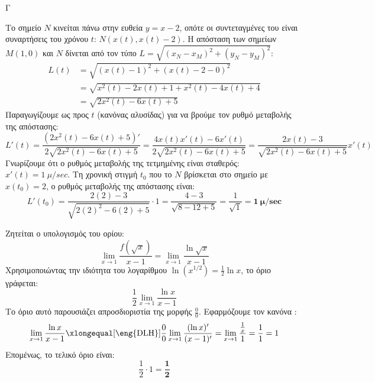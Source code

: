 \begin{thema}{Γ}
\begin{erwthma}
\item Το σημείο $N$ κινείται πάνω στην ευθεία $y = x - 2$, οπότε οι συντεταγμένες του είναι συναρτήσεις του χρόνου $t$: $N(x(t), x(t) - 2)$.
Η απόσταση των σημείων $M(1, 0)$ και $N$ δίνεται από τον τύπο $L = \sqrt{(x_N - x_M)^2 + (y_N - y_M)^2}$:
\begin{align*}
L(t) &= \sqrt{(x(t) - 1)^2 + (x(t) - 2 - 0)^2} \\
&= \sqrt{x^2(t) - 2x(t) + 1 + x^2(t) - 4x(t) + 4} \\
&= \sqrt{2x^2(t) - 6x(t) + 5}
\end{align*}
Παραγωγίζουμε ως προς $t$ (κανόνας αλυσίδας) για να βρούμε τον ρυθμό μεταβολής της απόστασης:
\[ L'(t) = \frac{(2x^2(t) - 6x(t) + 5)'}{2\sqrt{2x^2(t) - 6x(t) + 5}} = \frac{4x(t)x'(t) - 6x'(t)}{2\sqrt{2x^2(t) - 6x(t) + 5}} = \frac{2x(t) - 3}{\sqrt{2x^2(t) - 6x(t) + 5}} x'(t) \]
Γνωρίζουμε ότι ο ρυθμός μεταβολής της τετμημένης είναι σταθερός: $x'(t) = 1 \ \mu/\si{sec}$.
Τη χρονική στιγμή $t_0$ που το $N$ βρίσκεται στο σημείο με $x(t_0) = 2$, ο ρυθμός μεταβολής της απόστασης είναι:
\[ L'(t_0) = \frac{2(2) - 3}{\sqrt{2(2)^2 - 6(2) + 5}} \cdot 1 = \frac{4 - 3}{\sqrt{8 - 12 + 5}} = \frac{1}{\sqrt{1}} = \boldsymbol{1 \ \mu/\si{sec}} \]

\item Ζητείται ο υπολογισμός του ορίου:
\[ \lim_{x \to 1} \frac{f(\sqrt{x})}{x - 1} = \lim_{x \to 1} \frac{\ln\sqrt{x}}{x - 1} \]
Χρησιμοποιώντας την ιδιότητα του λογαρίθμου $\ln(x^{1/2}) = \frac{1}{2}\ln x$, το όριο γράφεται:
\[ \frac{1}{2} \lim_{x \to 1} \frac{\ln x}{x - 1} \]
Το όριο αυτό παρουσιάζει απροσδιοριστία της μορφής $\frac{0}{0}$. Εφαρμόζουμε τον κανόνα :
\[ \lim_{x \to 1} \frac{\ln x}{x - 1} \xlongequal[\text{\eng{DLH}}]{\frac{0}{0}} \lim_{x \to 1} \frac{(\ln x)'}{(x - 1)'} = \lim_{x \to 1} \frac{\frac{1}{x}}{1} = \frac{1}{1} = 1 \]
Επομένως, το τελικό όριο είναι:
\[ \frac{1}{2} \cdot 1 = \boldsymbol{\frac{1}{2}} \]
\end{erwthma}
\end{thema}

